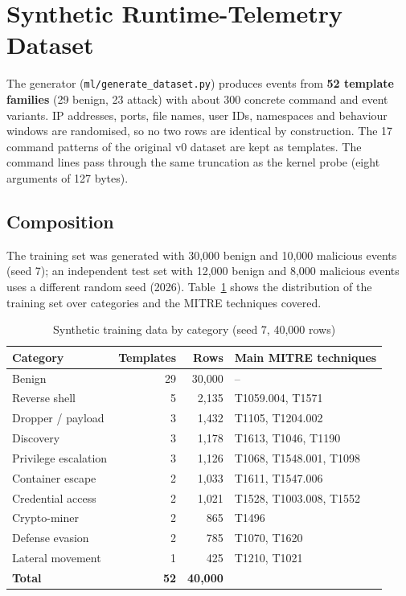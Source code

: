 \section{Synthetic Runtime-Telemetry Dataset}

The generator (\texttt{ml/generate\_dataset.py}) produces events from \textbf{52 template
families} (29 benign, 23 attack) with about 300 concrete command and event variants.
IP addresses, ports, file names, user IDs, namespaces and behaviour windows are
randomised, so no two rows are identical by construction. The 17 command patterns of
the original v0 dataset are kept as templates. The command lines pass through the same
truncation as the kernel probe (eight arguments of 127 bytes).

\subsection{Composition}

The training set was generated with 30,000 benign and 10,000 malicious events (seed 7);
an independent test set with 12,000 benign and 8,000 malicious events uses a different
random seed (2026). Table~\ref{tab:categories} shows the distribution of the training
set over categories and the MITRE techniques covered.

\begin{table}[H]
\centering
\caption{Synthetic training data by category (seed 7, 40,000 rows)}
\label{tab:categories}
\small
\begin{tabular}{lrrl}
\toprule
\textbf{Category} & \textbf{Templates} & \textbf{Rows} & \textbf{Main MITRE techniques} \\
\midrule
Benign                & 29 & 30,000 & -- \\
Reverse shell         & 5  & 2,135  & T1059.004, T1571 \\
Dropper / payload     & 3  & 1,432  & T1105, T1204.002 \\
Discovery             & 3  & 1,178  & T1613, T1046, T1190 \\
Privilege escalation  & 3  & 1,126  & T1068, T1548.001, T1098 \\
Container escape      & 2  & 1,033  & T1611, T1547.006 \\
Credential access     & 2  & 1,021  & T1528, T1003.008, T1552 \\
Crypto-miner          & 2  & 865    & T1496 \\
Defense evasion       & 2  & 785    & T1070, T1620 \\
Lateral movement      & 1  & 425    & T1210, T1021 \\
\midrule
\textbf{Total}        & \textbf{52} & \textbf{40,000} & \\
\bottomrule
\end{tabular}
\end{table}

